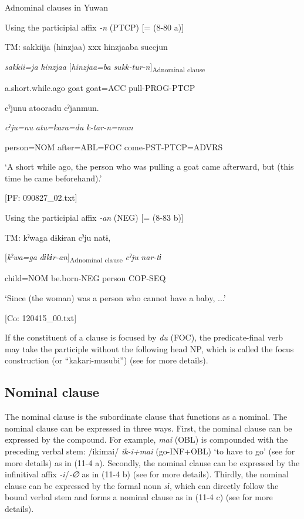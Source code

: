 \ea\label{ex:11-3}  Adnominal clauses in Yuwan

  \ea Using the participial affix \textit{{}-n} (PTCP) [= (8-80 a)]

  TM:  sakkiija  (hinzjaa)  xxx  hinzjaaba  succjun

    \textit{sakkii=ja}  \textit{hinzjaa}    [\textit{hinzjaa=ba}  \textit{sukk-tur-n}]\textsubscript{Adnominal clause}

    a.short.while.ago  goat    goat=ACC  pull-PROG-PTCP

    cˀjunu  atooradu  cˀjanmun.

    \textit{cˀju=nu}  \textit{atu=kara=du}  \textit{k-tar-n=mun}

    person=NOM  after=ABL=FOC  come-PST-PTCP=ADVRS

    ‘A short while ago, the person who was pulling a goat came afterward, but (this time he came beforehand).’

    [PF: 090827\_02.txt]

  \ex Using the participial affix \textit{{}-an} (NEG) [= (8-83 b)]

  TM:  kˀwaga  dɨkɨran  cˀju  natɨ,

    [\textit{kˀwa=ga}  \textit{dɨkɨr-an}]\textsubscript{Adnominal clause}  \textit{cˀju}  \textit{nar-tɨ}

    child=NOM  be.born-NEG  person  COP-SEQ

    ‘Since (the woman) was a person who cannot have a baby, ...’

    [Co: 120415\_00.txt]
\z
\z

If the constituent of a clause is focused by \textit{du} (FOC), the predicate-final verb may take the participle without the following head NP, which is called the focus construction (or “kakari-musubi”) (see  for more details).

\subsection{Nominal clause}\label{sec:11.1.3}

The nominal clause is the subordinate clause that functions as a nominal. The nominal clause can be expressed in three ways. First, the nominal clause can be expressed by the compound. For example, \textit{mai} (OBL) is compounded with the preceding verbal stem: /ikimai/ \textit{ik-i+mai} (go-INF+OBL) ‘to have to go’ (see  for more details) as in (11-4 a). Secondly, the nominal clause can be expressed by the infinitival affix \textit{{}-i}/\textit{{}-∅} as in (11-4 b) (see  for more details). Thirdly, the nominal clause can be expressed by the formal noun \textit{sɨ}, which can directly follow the bound verbal stem and forms a nominal clause as in (11-4 c) (see  for more details).

